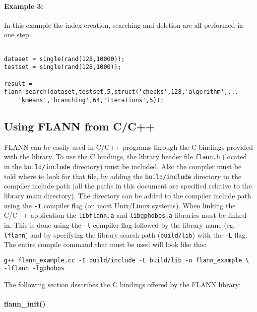 \documentclass[letter,10pt]{article}
\begin{document}
\paragraph{Example 3:}

In this example the index creation, searching and deletion are all performed in one step:

\begin{Verbatim}[fontsize=\footnotesize,frame=single]

dataset = single(rand(128,10000));
testset = single(rand(128,1000));

result = flann_search(dataset,testset,5,struct('checks',128,'algorithm',...
    'kmeans','branching',64,'iterations',5));

\end{Verbatim}

\subsection{Using FLANN from C/C++}

FLANN can be easily used in C/C++ programs through the C bindings provided
with the library. To use the C bindings, the library header file
\texttt{flann.h} (located in the \texttt{build/include} directory) must be
included. Also the compiler must be told where to look for that file, by
adding the \texttt{build/include} directory to the compiler include path
(all the paths in this document are specified relative to the library main
directory). The directory can be added to the compiler include
path using the \texttt{-I} compiler flag (on most Unix/Linux systems). When
linking the C/C++ application the \texttt{libflann.a} and
\texttt{libgphobos.a} libraries must be linked in. This is done using the
\texttt{-l} compiler flag followed by the library name
(eg. \texttt{-lflann}) and by specifying the library search path
(\texttt{build/lib}) with the \texttt{-L} flag. The entire compile command
that must be used will look like this:
\begin{Verbatim}[fontsize=\footnotesize]
g++ flann_example.cc -I build/include -L build/lib -o flann_example \
-lflann -lgphobos
\end{Verbatim}

The following section describes the C bindings offered by the FLANN
library:

\paragraph{flann\_init()}
\end{document}
